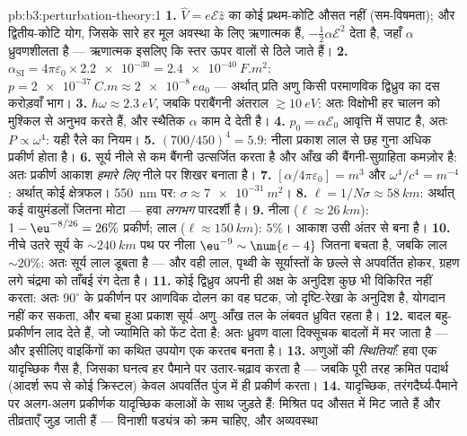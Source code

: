 \begin{solution}{pb:b3:perturbation-theory:1}
\textbf{1.} $\hat V = e\mathcal E\hat z$ का कोई प्रथम-कोटि औसत नहीं
(सम-विषमता); और द्वितीय-कोटि योग, जिसके सारे हर मूल अवस्था के लिए
ऋणात्मक हैं, $-\tfrac12\alpha\mathcal E^2$ देता है, जहाँ $\alpha$
ध्रुवणशीलता है --- ऋणात्मक इसलिए कि स्तर ऊपर वालों से ठिले जाते हैं।
\textbf{2.} $\alpha_{\text{SI}} = 4\pi\varepsilon_0 \times
\num{2.2e-30} = \qty{2.4e-40}{F.m^2}$: $p = \qty{2e-37}{C.m}
\approx \num{2e-8}\,ea_0$ --- अर्थात् प्रति अणु किसी परमाणविक
द्विध्रुव का दस करोड़वाँ भाग।
\textbf{3.} $\hbar\omega \approx \qty{2.3}{eV}$, जबकि
पराबैंगनी अंतराल $\gtrsim\qty{10}{eV}$: अतः विक्षोभी
हर चालन को मुश्किल से अनुभव करते हैं, और स्थैतिक $\alpha$
काम दे देती है।
\textbf{4.} $p_0 = \alpha\mathcal E_0$ आवृत्ति में सपाट है, अतः $P
\propto \omega^4$: यही रैले का नियम।
\textbf{5.} $(700/450)^4 = 5.9$: नीला प्रकाश लाल से छह गुना अधिक
प्रकीर्ण होता है।
\textbf{6.} सूर्य नीले से कम बैंगनी उत्सर्जित करता है और आँख की
बैंगनी-सुग्राहिता कमज़ोर है: अतः प्रकीर्ण आकाश \emph{हमारे लिए}
नीले पर शिखर बनाता है।
\textbf{7.} $[\alpha/4\pi\varepsilon_0] = \unit{m^3}$ और
$\omega^4/c^4 = \unit{m^{-4}}$: अर्थात् कोई क्षेत्रफल। \qty{550}{nm} पर:
$\sigma \approx \qty{7e-31}{m^2}$।
\textbf{8.} $\ell = 1/N\sigma \approx \qty{58}{km}$: अर्थात् कई
वायुमंडलों जितना मोटा --- हवा \emph{लगभग} पारदर्शी है।
\textbf{9.} नीला ($\ell \approx \qty{26}{km}$): $1 -
\eu^{-8/26} = 26\%$ प्रकीर्ण; लाल ($\ell \approx \qty{150}{km}$):
$5\%$। आकाश उसी अंतर से बना है।
\textbf{10.} नीचे उतरे सूर्य के $\sim\qty{240}{km}$ पथ पर नीला
$\eu^{-9} \sim \num{e-4}$ जितना बचता है, जबकि लाल $\sim20\%$: अतः
सूर्य लाल डूबता है --- और वही लाल, पृथ्वी के सूर्यास्तों के छल्ले से
अपवर्तित होकर, ग्रहण लगे चंद्रमा को ताँबई रंग देता है।
\textbf{11.} कोई द्विध्रुव अपनी ही अक्ष के अनुदिश कुछ भी विकिरित नहीं
करता: अतः $90^\circ$ के प्रकीर्णन पर आणविक दोलन का वह घटक, जो
दृष्टि-रेखा के अनुदिश है, योगदान नहीं कर सकता, और बचा हुआ
प्रकाश सूर्य--अणु--आँख तल के लंबवत ध्रुवित रहता है।
\textbf{12.} बादल बहु-प्रकीर्णन लाद देते हैं, जो ज्यामिति को फेंट देता
है: अतः ध्रुवण वाला दिक्सूचक बादलों में मर जाता है ---
और इसीलिए वाइकिंगों का कथित उपयोग एक करतब बनता है।
\textbf{13.} अणुओं की \emph{स्थितियाँ}: हवा एक यादृच्छिक
गैस है, जिसका घनत्व हर पैमाने पर उतार-चढ़ाव करता है --- जबकि पूरी तरह
क्रमित पदार्थ (आदर्श रूप से कोई क्रिस्टल) केवल अपवर्तित पुंज में ही
प्रकीर्ण करता।
\textbf{14.} यादृच्छिक, तरंगदैर्घ्य-पैमाने पर अलग-अलग प्रकीर्णक
यादृच्छिक कलाओं के साथ जुड़ते हैं: मिश्रित पद औसत में मिट जाते हैं और
तीव्रताएँ जुड़ जाती हैं --- विनाशी षड्यंत्र को क्रम चाहिए, और अव्यवस्था

\end{solution}
